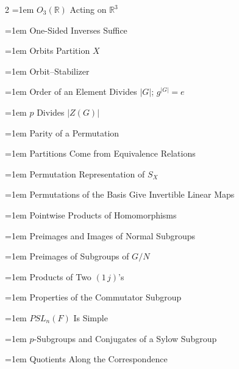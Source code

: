 \documentclass[11pt]{report}
\begin{document}
\begin{multicols}{2}
\noindent\hangindent=1em $O_3(\mathbb{R})$ Acting on $\mathbb{R}^3$\dotfill \pageref{prop:o3-r-acting-r3}\par
\noindent\hangindent=1em One-Sided Inverses Suffice\dotfill \pageref{prop:one-sided-inverses-suffice}\par
\noindent\hangindent=1em Orbits Partition $X$\dotfill \pageref{prop:orbits-partition-x}\par
\noindent\hangindent=1em Orbit--Stabilizer\dotfill \pageref{thm:orbit-stabilizer}\par
\noindent\hangindent=1em Order of an Element Divides $|G|$; $g^{|G|} = e$\dotfill \pageref{cor:order-element-divides-g-g-g-e}\par
\noindent\hangindent=1em $p$ Divides $|Z(G)|$\dotfill \pageref{cor:p-divides-z-g}\par
\noindent\hangindent=1em Parity of a Permutation\dotfill \pageref{cor:parity-permutation}\par
\noindent\hangindent=1em Partitions Come from Equivalence Relations\dotfill \pageref{prop:partitions-come-equivalence-relations}\par
\noindent\hangindent=1em Permutation Representation of $S_X$\dotfill \pageref{prop:permutation-representation-sx}\par
\noindent\hangindent=1em Permutations of the Basis Give Invertible Linear Maps\dotfill \pageref{cor:permutations-basis-give-invertible-linear-maps}\par
\noindent\hangindent=1em Pointwise Products of Homomorphisms\dotfill \pageref{prop:pointwise-products-homomorphisms}\par
\noindent\hangindent=1em Preimages and Images of Normal Subgroups\dotfill \pageref{prop:preimages-images-normal-subgroups}\par
\noindent\hangindent=1em Preimages of Subgroups of $G/N$\dotfill \pageref{prop:preimages-subgroups-quotient}\par
\noindent\hangindent=1em Products of Two $(1\,j)$'s\dotfill \pageref{lem:products-two-1-j-s}\par
\noindent\hangindent=1em Properties of the Commutator Subgroup\dotfill \pageref{prop:properties-commutator-subgroup}\par
\noindent\hangindent=1em $PSL_n(F)$ Is Simple\dotfill \pageref{thm:psln-f-simple}\par
\noindent\hangindent=1em $p$-Subgroups and Conjugates of a Sylow Subgroup\dotfill \pageref{prop:p-subgroups-conjugates-sylow}\par
\noindent\hangindent=1em Quotients Along the Correspondence\dotfill \pageref{prop:quotients-along-correspondence}\par

\end{multicols}
\end{document}
